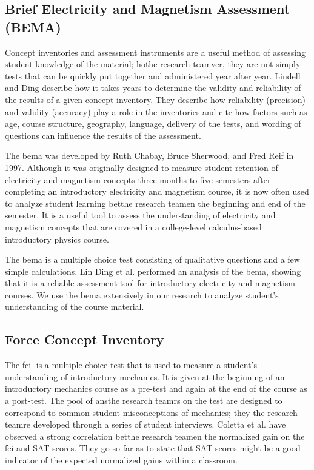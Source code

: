 \subsection{Brief Electricity and Magnetism Assessment (BEMA)}

Concept inventories and assessment instruments are a useful method of assessing student knowledge of the material; hothe research teamver, they are not simply tests that can be quickly put together and administered year after year. Lindell and Ding describe how it takes years to determine the validity and reliability of the results of a given concept inventory. They describe how reliability (precision) and validity (accuracy) play a role in the inventories and cite how factors such as age, course structure, geography, language, delivery of the tests, and wording of questions can influence the results of the assessment\cite{lindell2012}.

The \gls{bema} was developed by Ruth Chabay, Bruce Sherwood, and Fred Reif in 1997. Although it was originally designed to measure student retention of electricity and magnetism concepts three months to five semesters after completing an introductory electricity and magnetism course, it is now often used to analyze student learning betthe research teamen the beginning and end of the semester. It is a useful tool to assess the understanding of electricity and magnetism concepts that are covered in a college-level calculus-based introductory physics course\cite{ding2006}.

The \gls{bema} is a multiple choice test consisting of qualitative questions and a few simple calculations. Lin Ding et al. performed an analysis of the \gls{bema}, showing that it is a reliable assessment tool for introductory electricity and magnetism courses\cite{ding2006}. We use the \gls{bema} extensively in our research to analyze student's understanding of the course material.

\subsection{Force Concept Inventory}

The \gls{fci}􏰁 is a multiple choice test that is used to measure a student's understanding of introductory mechanics. It is given at the beginning of an introductory mechanics course as a pre-test and again at the end of the course as a post-test. The pool of ansthe research teamrs on the test are designed to correspond to common student misconceptions of mechanics; they the research teamre developed through a series of student interviews\cite{hestenes1992}. Coletta et al. have observed a strong correlation betthe research teamen the normalized gain on the \gls{fci} and SAT scores. They go so far as to state that SAT scores might be a good indicator of the expected normalized gains within a classroom\cite{coletta2007}.

